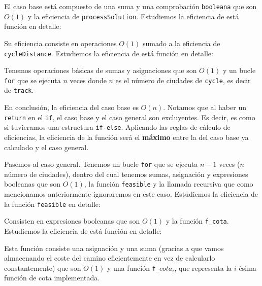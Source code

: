 \documentclass{article}
\begin{document}


El caso base está compuesto de una suma y una comprobación \verb|booleana|
que son $O(1)$ y la eficiencia de \verb|processSolution|. Estudiemos la eficiencia de está función en detalle:



Su eficiencia consiste en operaciones $O(1)$ sumado a la eficiencia de \verb|cycleDistance|. Estudiemos la eficiencia de está función en detalle:



Tenemos operaciones básicas de sumas y asignaciones que son $O(1)$ y un bucle \texttt{for} que se ejecuta $n$ veces donde $n$ es el número de ciudades de \verb|cycle|, es decir de \verb|track|.

En conclusión, la eficiencia del caso base es $O(n)$. Notamos que al haber un \texttt{return} en el \texttt{if}, el caso base y el caso general son excluyentes. Es decir, es como si tuvieramos una estructura \texttt{if-else}.
Aplicando las reglas de cálculo de eficiencias, la eficiencia de la función será el \textbf{máximo} entre la del caso base ya calculado y el caso general.



Pasemos al caso general. Tenemos un bucle \texttt{for}
que se ejecuta $n-1$ veces ($n$ número de ciudades), dentro del cual tenemos sumas, asignación y expresiones booleanas que son $O(1)$, la función \verb|feasible| y la llamada recursiva que como mencionamos anteriormente ignoraremos en este caso.
Estudiemos la eficiencia de la función \verb|feasible| en detalle:



Consisten en expresiones booleanas que son $O(1)$ y la función \verb|f_cota|.
Estudiemos la eficiencia de está función en detalle:



Esta función consiste una asignación y una suma (gracias a que vamos almacenando el coste del camino eficientemente en vez de calcularlo constantemente) que son $O(1)$ y una función \texttt{f\_$cota_i$}, que representa la $i$-ésima función de cota implementada.
\end{document}
